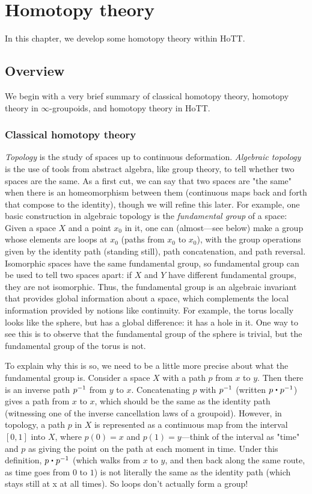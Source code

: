 \chapter{Homotopy theory}
\label{cha:homotopy}

In this chapter, we develop some homotopy theory within HoTT.  

\section{Overview}

We begin with a very brief summary of classical homotopy theory,
homotopy theory in $\infty$-groupoids, and homotopy theory in HoTT.

\subsection{Classical homotopy theory}

\emph{Topology} is the study of spaces up to continuous deformation.
\emph{Algebraic topology} is the use of tools from abstract algebra,
like group theory, to tell whether two spaces are the same.  As a first
cut, we can say that two spaces are "the same" when there is an
homeomorphism between them (continuous maps back and forth that compose to
the identity), though we will refine this later.  For example, one basic
construction in algebraic topology is the \emph{fundamental group} of a
space: Given a space $X$ and a point $x_0$ in it, one can (almost---see
below) make a group whose elements are loops at $x_0$ (paths from $x_0$
to $x_0$), with the group operations given by the identity path
(standing still), path concatenation, and path reversal.  Isomorphic
spaces have the same fundamental group, so fundamental group can be used
to tell two spaces apart: if $X$ and $Y$ have different fundamental
groups, they are not isomorphic.  Thus, the fundamental group is an
algebraic invariant that provides global information about a space,
which complements the local information provided by notions like
continuity.  For example, the torus locally looks like the sphere, but
has a global difference: it has a hole in it.  One way to see this is to
observe that the fundamental group of the sphere is trivial, but the
fundamental group of the torus is not.

To explain why this is so, we need to be a little more precise about
what the fundamental group is.  Consider a space $X$ with a path $p$
from $x$ to $y$.  Then there is an inverse path $\mathord{{p}^{-1}}$ from $y$ to
$x$.  Concatenating $p$ with $\mathord{{p}^{-1}}$ (written $p \ct \opp p$) gives a
path from $x$ to $x$, which should be the same as the identity path
(witnessing one of the inverse cancellation laws of a groupoid).
However, in topology, a path $p$ in $X$ is represented as a continuous
map from the interval $[0,1]$ into $X$, where $p(0) = x$ and $p(1) =
y$---think of the interval as "time" and $p$ as giving the point on the
path at each moment in time.  Under this definition, $p \ct \opp p$
(which walks from $x$ to $y$, and then back along the same route, as
time goes from $0$ to $1$) is not literally the same as the identity
path (which stays still at x at all times).  So loops don't actually
form a group!

